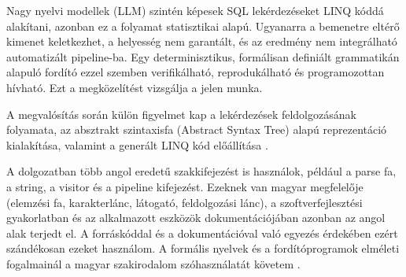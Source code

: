 Nagy nyelvi modellek (LLM) szintén képesek SQL lekérdezéseket LINQ kóddá alakítani, azonban ez a folyamat statisztikai alapú. Ugyanarra a bemenetre eltérő kimenet keletkezhet, a helyesség nem garantált, és az eredmény nem integrálható automatizált pipeline-ba. Egy determinisztikus, formálisan definiált grammatikán alapuló fordító ezzel szemben verifikálható, reprodukálható és programozottan hívható. Ezt a megközelítést vizsgálja a jelen munka.

A megvalósítás során külön figyelmet kap a lekérdezések feldolgozásának folyamata, az absztrakt szintaxisfa (Abstract Syntax Tree) alapú reprezentáció kialakítása, valamint a generált LINQ kód előállítása \cite{parr2013antlr4}.

A dolgozatban több angol eredetű szakkifejezést is használok, például a parse fa, a string, a visitor és a pipeline kifejezést. Ezeknek van magyar megfelelője (elemzési fa, karakterlánc, látogató, feldolgozási lánc), a szoftverfejlesztési gyakorlatban és az alkalmazott eszközök dokumentációjában azonban az angol alak terjedt el. A forráskóddal és a dokumentációval való egyezés érdekében ezért szándékosan ezeket használom. A formális nyelvek és a fordítóprogramok elméleti fogalmainál a magyar szakirodalom szóhasználatát követem \cite{bach2002formalis,csornyei2006fordprog}.

